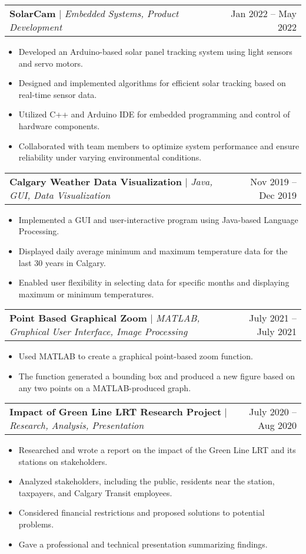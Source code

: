 \documentclass[A4,10pt]{article}
\makeatletter
\newcommand{\resumeItem}[1]{
  \item\small{
    {#1 \vspace{-2pt}}
  }
}
\newcommand{\resumeProjectHeading}[2]{
    \item
    \begin{tabular*}{0.97\textwidth}{l@{\extracolsep{\fill}}r}
      \small#1 & #2 \\
    \end{tabular*}\vspace{-7pt}
}
\newcommand{\resumeItemListStart}{\begin{itemize}}
\newcommand{\resumeItemListEnd}{\end{itemize}\vspace{-5pt}}
\makeatother
\begin{document}
        \resumeProjectHeading
        {\textbf{SolarCam} $|$ \emph{Embedded Systems, Product Development}}{Jan 2022 -- May 2022}
        \resumeItemListStart
          \resumeItem{Developed an Arduino-based solar panel tracking system using light sensors and servo motors.}
          \resumeItem{Designed and implemented algorithms for efficient solar tracking based on real-time sensor data.}
          \resumeItem{Utilized C++ and Arduino IDE for embedded programming and control of hardware components.}
          \resumeItem{Collaborated with team members to optimize system performance and ensure reliability under varying environmental conditions.}
        \resumeItemListEnd
  
        \resumeProjectHeading
        {\textbf{Calgary Weather Data Visualization} $|$ \emph{Java, GUI, Data Visualization}}{Nov 2019 -- Dec 2019}
        \resumeItemListStart
          \resumeItem{Implemented a GUI and user-interactive program using Java-based Language Processing.}
          \resumeItem{Displayed daily average minimum and maximum temperature data for the last 30 years in Calgary.}
          \resumeItem{Enabled user flexibility in selecting data for specific months and displaying maximum or minimum temperatures.}
        \resumeItemListEnd
  
        \resumeProjectHeading
        {\textbf{Point Based Graphical Zoom} $|$ \emph{MATLAB, Graphical User Interface, Image Processing}}{July 2021 -- July 2021}
        \resumeItemListStart
          \resumeItem{Used MATLAB to create a graphical point-based zoom function.}
          \resumeItem{The function generated a bounding box and produced a new figure based on any two points on a MATLAB-produced graph.}
        \resumeItemListEnd
  
        \resumeProjectHeading
        {\textbf{Impact of Green Line LRT Research Project} $|$ \emph{Research, Analysis, Presentation}}{July 2020 -- Aug 2020}
        \resumeItemListStart
          \resumeItem{Researched and wrote a report on the impact of the Green Line LRT and its stations on stakeholders.}
          \resumeItem{Analyzed stakeholders, including the public, residents near the station, taxpayers, and Calgary Transit employees.}
          \resumeItem{Considered financial restrictions and proposed solutions to potential problems.}
          \resumeItem{Gave a professional and technical presentation summarizing findings.}
        \resumeItemListEnd
  
\end{document}
